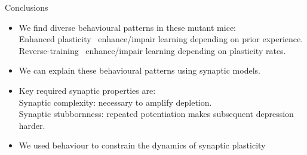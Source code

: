 \documentclass{beamer}%
\begin{document}
\begin{frame}{Conclusions}
%
 \begin{itemize}
   \item We find diverse behavioural patterns in these mutant mice:\\

   \alert{Enhanced plasticity \lto\ enhance/impair} learning depending on prior experience.\\
   \alert{Reverse-training \lto\ enhance/impair} learning depending on plasticity rates.

   \item We can explain these behavioural patterns using synaptic models.

   \item Key required synaptic properties are:\\
   \alert{Synaptic complexity:} necessary to amplify depletion.\\
   \alert{Synaptic stubbornness:} repeated potentiation makes subsequent depression harder.

   \item  We used behaviour to constrain the dynamics of synaptic plasticity
\end{itemize}
%
\end{frame}
\end{document}
